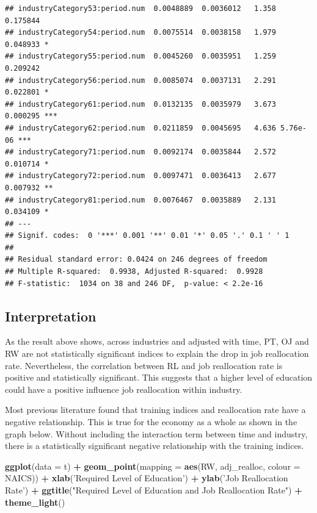 \documentclass[
]{article}
\newenvironment{Shaded}{\begin{snugshade}}{\end{snugshade}}
\newcommand{\DataTypeTok}[1]{\textcolor[rgb]{0.13,0.29,0.53}{#1}}
\newcommand{\KeywordTok}[1]{\textcolor[rgb]{0.13,0.29,0.53}{\textbf{#1}}}
\newcommand{\NormalTok}[1]{#1}
\newcommand{\OperatorTok}[1]{\textcolor[rgb]{0.81,0.36,0.00}{\textbf{#1}}}
\newcommand{\StringTok}[1]{\textcolor[rgb]{0.31,0.60,0.02}{#1}}
\begin{document}
\begin{verbatim}
## industryCategory53:period.num  0.0048889  0.0036012   1.358 0.175844    
## industryCategory54:period.num  0.0075514  0.0038158   1.979 0.048933 *  
## industryCategory55:period.num  0.0045260  0.0035951   1.259 0.209242    
## industryCategory56:period.num  0.0085074  0.0037131   2.291 0.022801 *  
## industryCategory61:period.num  0.0132135  0.0035979   3.673 0.000295 ***
## industryCategory62:period.num  0.0211859  0.0045695   4.636 5.76e-06 ***
## industryCategory71:period.num  0.0092174  0.0035844   2.572 0.010714 *  
## industryCategory72:period.num  0.0097471  0.0036413   2.677 0.007932 ** 
## industryCategory81:period.num  0.0076467  0.0035889   2.131 0.034109 *  
## ---
## Signif. codes:  0 '***' 0.001 '**' 0.01 '*' 0.05 '.' 0.1 ' ' 1
## 
## Residual standard error: 0.0424 on 246 degrees of freedom
## Multiple R-squared:  0.9938, Adjusted R-squared:  0.9928 
## F-statistic:  1034 on 38 and 246 DF,  p-value: < 2.2e-16
\end{verbatim}

\hypertarget{interpretation}{%
\subsection{Interpretation}\label{interpretation}}

As the result above shows, across industries and adjusted with time, PT,
OJ and RW are not statistically significant indices to explain the drop
in job reallocation rate. Nevertheless, the correlation between RL and
job reallocation rate is positive and statistically significant. This
suggests that a higher level of education could have a positive
influence job reallocation within industry.

Most previous literature found that training indices and reallocation
rate have a negative relationship. This is true for the economy as a
whole as shown in the graph below. Without including the interaction
term between time and industry, there is a statistically significant
negative relationship with the training indices.

\begin{Shaded}
\begin{Highlighting}[]
\KeywordTok{ggplot}\NormalTok{(}\DataTypeTok{data =}\NormalTok{ t) }\OperatorTok{+}
\StringTok{  }\KeywordTok{geom_point}\NormalTok{(}\DataTypeTok{mapping =} \KeywordTok{aes}\NormalTok{(RW, adj_realloc, }\DataTypeTok{colour =}\NormalTok{ NAICS)) }\OperatorTok{+}
\StringTok{  }\KeywordTok{xlab}\NormalTok{(}\StringTok{'Required Level of Education'}\NormalTok{) }\OperatorTok{+}\StringTok{ }
\StringTok{  }\KeywordTok{ylab}\NormalTok{(}\StringTok{'Job Reallocation Rate'}\NormalTok{) }\OperatorTok{+}\StringTok{ }
\StringTok{  }\KeywordTok{ggtitle}\NormalTok{(}\StringTok{"Required Level of Education and Job Reallocation Rate"}\NormalTok{) }\OperatorTok{+}
\StringTok{  }\KeywordTok{theme_light}\NormalTok{()}
\end{Highlighting}
\end{Shaded}
\end{document}
